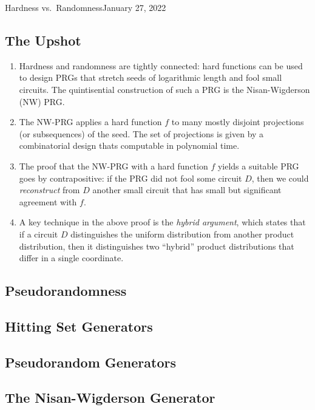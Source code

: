 \begin{lecture}{2}{Hardness vs.\ Randomness}{January 27, 2022}
\label{lec:02}

\subsection*{The Upshot}

\begin{enumerate}
  \item Hardness and randomness are tightly connected: hard functions can be
    used to design PRGs that stretch seeds of logarithmic length and fool small
    circuits. The quintisential construction of such a PRG is the
    Nisan-Wigderson (NW) PRG.
  \item The NW-PRG applies a hard function $f$ to many mostly disjoint
    projections (or subsequences) of the seed. The set of projections is given
    by a combinatorial design thats computable in polynomial time.
  \item The proof that the NW-PRG with a hard function $f$ yields a suitable
    PRG goes by contrapositive: if the PRG did not fool some circuit $D$, then we
    could \emph{reconstruct} from $D$ another small circuit that has small but
    significant agreement with $f$.
  \item A key technique in the above proof is the \emph{hybrid argument}, which
    states that if a circuit $D$ distinguishes the uniform distribution from
    another product distribution, then it distinguishes two ``hybrid'' product
    distributions that differ in a single coordinate.
\end{enumerate}

\subsection{Pseudorandomness}

\subsection{Hitting Set Generators}

\subsection{Pseudorandom Generators}

\subsection{The Nisan-Wigderson Generator}

\end{lecture}

